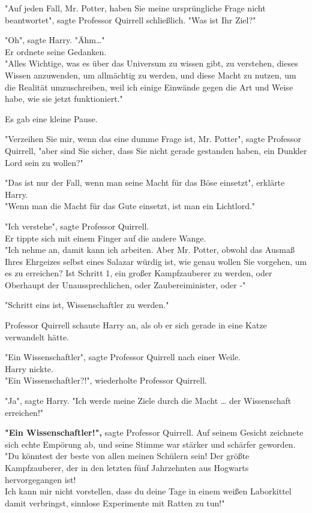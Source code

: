 {"Auf jeden Fall, Mr. Potter, haben Sie meine ursprüngliche Frage nicht beantwortet", sagte Professor Quirrell schließlich. "Was ist Ihr Ziel?"

"Oh", sagte Harry. "Ähm…"\\ Er ordnete seine Gedanken.\\ "Alles Wichtige, was es über das Universum zu wissen gibt, zu verstehen, dieses Wissen anzuwenden, um allmächtig zu werden, und diese Macht zu nutzen, um die Realität umzuschreiben, weil ich einige Einwände gegen die Art und Weise habe, wie sie jetzt funktioniert."

Es gab eine kleine Pause.

"Verzeihen Sie mir, wenn das eine dumme Frage ist, Mr. Potter", sagte Professor Quirrell, "aber sind Sie sicher, dass Sie nicht gerade gestanden haben, ein Dunkler Lord sein zu wollen?"

"Das ist nur der Fall, wenn man seine Macht für das Böse einsetzt", erklärte Harry.\\ "Wenn man die Macht für das Gute einsetzt, ist man ein Lichtlord."

"Ich verstehe", sagte Professor Quirrell.\\ Er tippte sich mit einem Finger auf die andere Wange.\\ "Ich nehme an, damit kann ich arbeiten. Aber Mr. Potter, obwohl das Ausmaß Ihres Ehrgeizes selbst eines Salazar würdig ist, wie genau wollen Sie vorgehen, um es zu erreichen? Ist Schritt 1, ein großer Kampfzauberer zu werden, oder Oberhaupt der Unaussprechlichen, oder Zaubereiminister, oder -"

"Schritt eins ist, Wissenschaftler zu werden."

Professor Quirrell schaute Harry an, als ob er sich gerade in eine Katze verwandelt hätte.

"Ein Wissenschaftler", sagte Professor Quirrell nach einer Weile.\\ Harry nickte.\\ "Ein Wissenschaftler?!", wiederholte Professor Quirrell.

"Ja", sagte Harry. "Ich werde meine Ziele durch die Macht … der Wissenschaft erreichen!"

\textbf{"Ein Wissenschaftler!",} sagte Professor Quirrell. Auf seinem Gesicht zeichnete sich echte Empörung ab, und seine Stimme war stärker und schärfer geworden.\\ "Du könntest der beste von allen meinen Schülern sein! Der größte Kampfzauberer, der in den letzten fünf Jahrzehnten aus Hogwarts hervorgegangen ist!\\ Ich kann mir nicht vorstellen, dass du deine Tage in einem weißen Laborkittel damit verbringst, sinnlose Experimente mit Ratten zu tun!"

}
